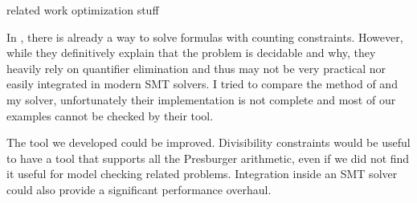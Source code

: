 
related work
optimization stuff

In \cite{AlbertiGP16, schweikardt}, there is already a way to solve
formulas with counting constraints. However, while they definitively explain that the problem
is decidable and why, they heavily rely on quantifier elimination and
thus may not be very practical nor easily integrated in modern SMT
solvers. I tried to compare the method of \cite{AlbertiGP16} and my solver,
unfortunately their implementation is not complete and most of our examples
cannot be checked by their tool.

The tool we developed could be improved. Divisibility constraints would be
useful to have a tool that supports all the Presburger arithmetic, even if we
did not find it useful for model checking related problems. Integration inside
an SMT solver could also provide a significant performance overhaul.
